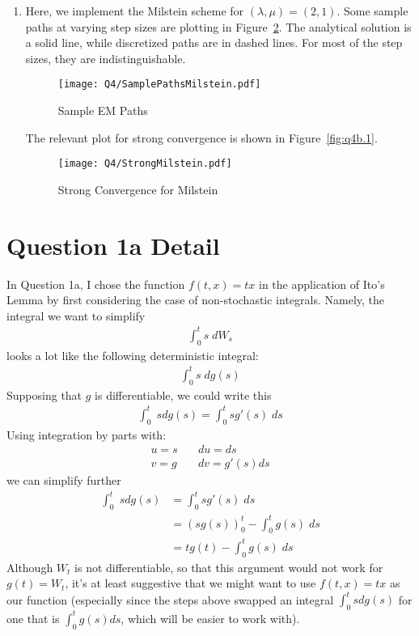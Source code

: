 \documentclass[12pt]{article}
\theoremstyle{plain}
\theoremstyle{definition}
\theoremstyle{remark}
\begin{document}
\begin{enumerate}
\begin{enumerate}
      \item %
        Here, we implement the Milstein scheme for
        $(\lambda,\mu)=(2,1)$.  Some sample paths at varying step sizes
        are plotting in Figure~\ref{fig:q4b}. The analytical solution is
        a solid line, while discretized paths are in dashed lines. For
        most of the step sizes, they are indistinguishable.
        \begin{figure}[htpb!]
          \caption{Sample EM Paths\label{fig:q4b}}
          \texttt{[image: Q4/SamplePathsMilstein.pdf]}
          \centering
        \end{figure}
        The relevant plot for strong convergence is shown in
        Figure~\ref{fig:q4b.1}.
        \begin{figure}[htpb!]
          \caption{Strong Convergence for Milstein\label{fig:q4b}}
          \texttt{[image: Q4/StrongMilstein.pdf]}
          \centering
        \end{figure}

    \end{enumerate}
\end{enumerate}

\clearpage
\appendix

\section{Question 1a Detail}

  In Question 1a, I chose the function $f(t,x)=tx$ in the
    application of Ito's Lemma by first considering the case of
    non-stochastic integrals. Namely, the integral we want to simplify
    \begin{align*}
      \int^t_0 s \;dW_s
    \end{align*}
    looks a lot like the following deterministic integral:
    \begin{align*}
      \int^t_0 s \;dg(s)
    \end{align*}
    Supposing that $g$ is differentiable, we could write this
    \begin{align*}
      \int^t_0 \;s dg(s)
      = \int^t_0 s g'(s) \;ds
    \end{align*}
    Using integration by parts with:
    \begin{align*}
      u = s &\quad du = ds \\
      v = g &\quad dv = g'(s) ds
    \end{align*}
    we can simplify further
    \begin{align*}
      \int^t_0 \;s dg(s)
      &= \int^t_0 s g'(s) \;ds \\
      &= \left( sg(s)\right)^t_0 - \int^t_0 g(s) \;ds \\
      &= tg(t) - \int^t_0 g(s) \;ds
    \end{align*}
    Although $W_t$ is not differentiable, so that this argument would
    not work for $g(t) = W_t$, it's at least suggestive that we might
    want to use $f(t,x) = tx$ as our function (especially since the
    steps above swapped an integral $\int^t_0 sdg(s)$ for one that is
    $\int^t_0 g(s) ds$, which will be easier to work with).
\end{document}
